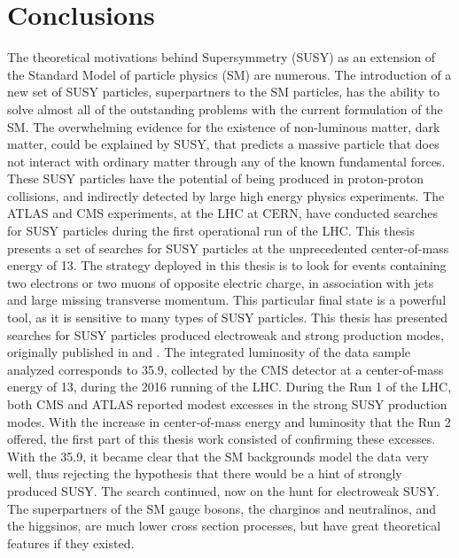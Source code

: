 \chapter{Conclusions}
\noindent\justify
The theoretical motivations behind Supersymmetry (SUSY) as an extension of the Standard Model of particle physics (SM) are numerous. 
The introduction of a new set of SUSY particles, superpartners to the SM particles, has the ability to solve almost all of the outstanding problems with the current formulation of the SM. 
The overwhelming evidence for the existence of non-luminous matter, dark matter, could be explained by SUSY, that predicts a massive particle that does not interact with ordinary matter through any of the known fundamental forces. 
\newpara
\noindent\justify
These SUSY particles have the potential of being produced in proton-proton collisions, and indirectly detected by large high energy physics experiments. 
The ATLAS and CMS experiments, at the LHC at CERN, have conducted searches for SUSY particles during the first operational run of the LHC. 
This thesis presents a set of searches for SUSY particles at the unprecedented center-of-mass energy of 13\TeV. 
The strategy deployed in this thesis is to look for events containing two electrons or two muons of opposite electric charge, in association with jets and large missing transverse momentum. 
This particular final state is a powerful tool, as it is sensitive to many types of SUSY particles. 
\newpara
\noindent\justify 
This thesis has presented searches for SUSY particles produced electroweak and strong production modes, originally published in \cite{Sirunyan:2017qaj} and \cite{Sirunyan:2018nwe}. 
The integrated luminosity of the data sample analyzed corresponds to 35.9\fbinv, collected by the CMS detector at a center-of-mass energy of 13\TeV, during the 2016 running of the LHC.
During the Run 1 of the LHC, both CMS and ATLAS reported modest excesses in the strong SUSY production modes.
With the increase in center-of-mass energy and luminosity that the Run 2 offered, the first part of this thesis work consisted of confirming these excesses. 
With the 35.9\fbinv, it became clear that the SM backgrounds model the data very well, thus rejecting the hypothesis that there would be a hint of strongly produced SUSY. 
\newpara
\noindent\justify
The search continued, now on the hunt for electroweak SUSY. 
The superpartners of the SM gauge bosons, the charginos and neutralinos, and the higgsinos, are much lower cross section processes, but have great theoretical features if they existed. 
